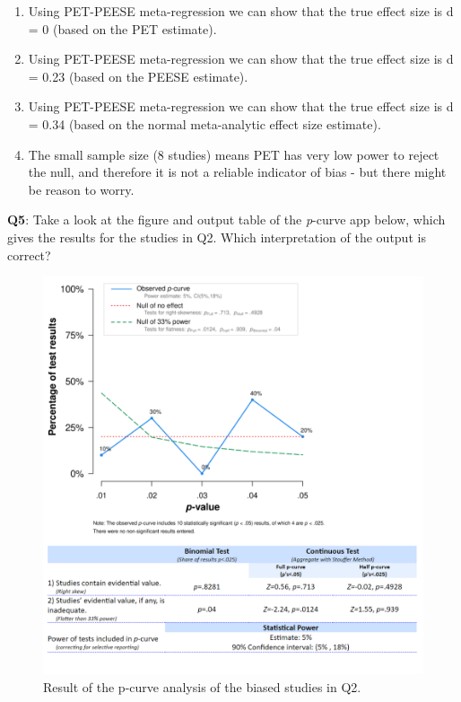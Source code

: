 \documentclass[
  oneside]{book}
\providecommand{\tightlist}{%
  \setlength{\itemsep}{0pt}\setlength{\parskip}{0pt}}
\begin{document}
\begin{enumerate}
\def\labelenumi{\Alph{enumi})}
\tightlist
\item
  Using PET-PEESE meta-regression we can show that the true effect size is d = 0 (based on the PET estimate).
\item
  Using PET-PEESE meta-regression we can show that the true effect size is d = 0.23 (based on the PEESE estimate).
\item
  Using PET-PEESE meta-regression we can show that the true effect size is d = 0.34 (based on the normal meta-analytic effect size estimate).
\item
  The small sample size (8 studies) means PET has very low power to reject the null, and therefore it is not a reliable indicator of bias - but there might be reason to worry.
\end{enumerate}

\textbf{Q5}: Take a look at the figure and output table of the \emph{p}-curve app below, which gives the results for the studies in Q2. Which interpretation of the output is correct?



\begin{figure}

{\centering \includegraphics[width=1\linewidth]{images/pcurveresultq5} 

}

\caption{Result of the p-curve analysis of the biased studies in Q2.}\label{fig:pcurveresultq5}
\end{figure}
\end{document}
